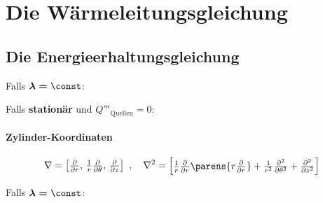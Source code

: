 
\section{Die Wärmeleitungsgleichung} %
	\subsection{Die Energieerhaltungsgleichung} %

		Falls $\boldsymbol{\lambda = \const}$:

		Falls \textbf{stationär} und $\dot{Q}'''_\text{Quellen} = 0$:

		\paragraph{Zylinder-Koordinaten} %
			\[
				\nabla = \begin{bmatrix}
					\frac{\partial}{\partial r},\, \frac{1}{r} \frac{\partial}{\partial \theta},\, \frac{\partial}{\partial z}
				\end{bmatrix}
				\ , \quad
				\nabla^2 = \begin{bmatrix}
					\frac{1}{r}\frac{\partial}{\partial r}\parens{r \frac{\partial}{\partial r}}+\frac{1}{r^2} \frac{\partial^2}{\partial \theta^2} + \frac{\partial^2}{\partial z^2}
				\end{bmatrix}
			\]

			Falls $\boldsymbol{\lambda = \const}$:


